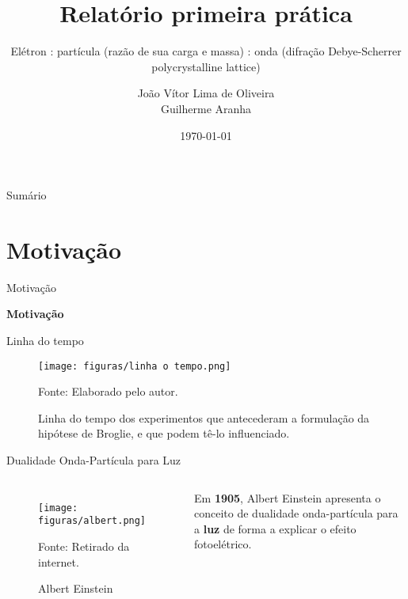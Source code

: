 \documentclass[aspectratio=169,12.5pt,xcolor=dvipsnames]{beamer}
\title{Relatório primeira prática}
\subtitle{Elétron : partícula (razão de sua carga e massa) : onda (difração Debye-Scherrer polycrystalline lattice)}
\author{João Vítor Lima de Oliveira
\\
Guilherme Aranha}
\institute
{
    Instituto de Física de São Carlos
    \\
    Universidade de São Paulo %
}
\date{\today} %
\begin{document}
\begin{frame}
    \titlepage
\end{frame}

\begin{frame}{Sumário}
    \tableofcontents
\end{frame}

\section{Motivação}

\begin{frame}{Motivação}
    \Huge{\centerline{\textbf{Motivação}}}
\end{frame}

\begin{frame}{Linha do tempo}

        \begin{center}
        \begin{figure}
        \caption{Linha do tempo dos experimentos que antecederam a formulação da hipótese de Broglie, e que podem tê-lo influenciado.}
        \vspace*{-0.25cm}
        \texttt{[image: figuras/linha o tempo.png]}\par
        {\scriptsize Fonte: Elaborado pelo autor.}
        \end{figure}
        \end{center}
    
\end{frame}



\begin{frame}{Dualidade Onda-Partícula para Luz}

    \begin{columns}[c]
        \begin{figure}
          \centering
          \caption{Albert Einstein}
          \texttt{[image: figuras/albert.png]}\par
          {\scriptsize Fonte: Retirado da internet.}
        \end{figure}

        Em \textbf{1905}, Albert Einstein apresenta o conceito de dualidade onda-partícula para a \textbf{luz} de forma a explicar o efeito fotoelétrico.

    \end{columns}

    
\end{frame}
\end{document}
